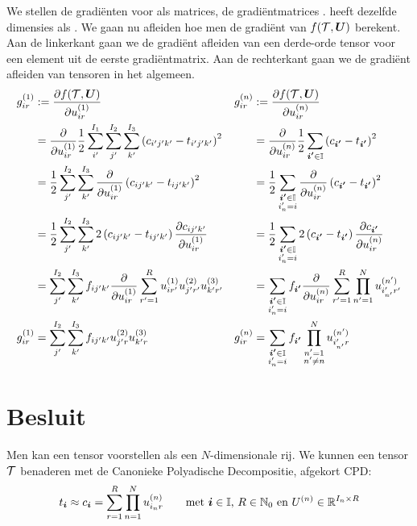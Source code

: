 We stellen de gradi\"enten voor als matrices, de gradi\"entmatrices \GGG{}. \GGG{} heeft dezelfde dimensies als \UUU{}. We gaan nu afleiden hoe men de gradi\"ent van $f(\mathcal{T}, \boldsymbol{U})$ berekent. Aan de linkerkant gaan we de gradi\"ent afleiden van een derde-orde tensor voor een element uit de eerste gradi\"entmatrix. Aan de rechterkant gaan we de gradi\"ent afleiden van tensoren in het algemeen.
\begin{align*}
	g^{(1)}_{ir} 	&:= \frac{\partial f(\T, \mUUU)}{\partial u^{(1)}_{ir}} &
    g^{(n)}_{ir} 	&:= \frac{\partial f(\T, \mUUU)}{\partial u^{(n)}_{ir}}\\
%    
					&=\frac{\partial}{\partial u^{(1)}_{ir}} \frac{1}{2}\sum_{i'}^{I_1}\sum_{j'}^{I_2}\sum_{k'}^{I_3}\left(c_{i'j'k'} - t_{i'j'k'} \right)^2 &
					&=\frac{\partial}{\partial u^{(n)}_{ir}} \frac{1}{2}\sum_{\iii{} \in \I}\left(c_{\iii{}} - t_{\iii{}} \right)^2\\
%					
					&= \frac{1}{2} \sum_{j'}^{I_2}\sum_{k'}^{I_3} \frac{\partial}{\partial u^{(1)}_{ir}} \left(c_{ij'k'} - t_{ij'k'} \right)^2 &
					&= \frac{1}{2} \sum_{\substack{\iii{} \in \I\\ i'_n = i}} \frac{\partial}{\partial u^{(n)}_{ir}} \left(c_{\iii{}} - t_{\iii{}} \right)^2\\
%					
					&= \frac{1}{2} \sum_{j'}^{I_2}\sum_{k'}^{I_3} 2 \left(c_{ij'k'} - t_{ij'k'} \right) \frac{\partial c_{ij'k'}}{\partial u^{(1)}_{ir}} &
					&= \frac{1}{2} \sum_{\substack{\iii{} \in \I\\ i'_n = i}} 2 \left(c_{\iii{}} - t_{\iii{}} \right) \frac{\partial c_{\iii{}}}{\partial u^{(n)}_{ir}}\\
%					
					&=\sum_{j'}^{I_2}\sum_{k'}^{I_3} f_{ij'k'} \frac{\partial}{\partial u^{(1)}_{ir}} \sum_{r'=1}^{R}  u^{(1)}_{ir'} u^{(2)}_{j'r'} u^{(3)}_{k'r'}&
					&=\sum_{\substack{\iii{} \in \I\\ i'_n = i}} f_{\iii{}} \frac{\partial}{\partial u^{(n)}_{ir}} \sum_{r'=1}^{R} \prod_{n'=1}^{N} u^{(n')}_{i'_{n'}r'}\\
%					
	g^{(1)}_{ir}	&=\sum_{j'}^{I_2}\sum_{k'}^{I_3} f_{ij'k'} u^{(2)}_{j'r} u^{(3)}_{k'r}&
	g^{(n)}_{ir}	&=\sum_{\substack{\iii{} \in \I\\ i'_n = i}} f_{\iii{}} \prod_{\substack{n'=1\\n'\neq n}}^{N} u^{(n')}_{i'_{n'}r}
\end{align*}

\section{Besluit}
Men kan een tensor voorstellen als een $N$-dimensionale rij. We kunnen een tensor $\mathcal{T}$ benaderen met de Canonieke Polyadische Decompositie, afgekort CPD: 
\[
    t_{\boldsymbol{i}{}} \approx c_{\boldsymbol{i}{}} = \sum_{r=1}^{R} \prod_{n=1}^{N} u^{(n)}_{i_{n}r} \qquad
    \text{met $\boldsymbol{i}{} \in \mathbb{I}$, $R \in \mathbb{N}_0$ en $U^{(n)} \in \mathbb{R}^{I_n \times R} $}
\]

